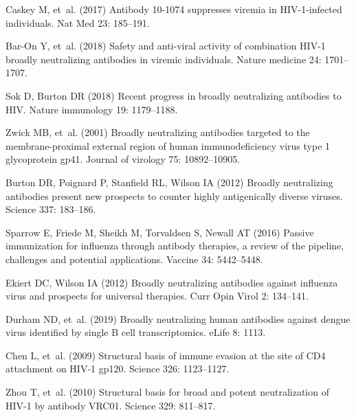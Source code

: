\documentclass[aps,prx,noshowpacs,twocolumn,nofootinbib]{revtex4-2}
\begin{document}
\begin{thebibliography}{10}
Caskey M, et~al. (2017) {Antibody 10-1074 suppresses viremia in HIV-1-infected
  individuals.}
\newblock Nat Med 23: 185--191.

{Bar-On} Y, et~al. (2018) Safety and anti-viral activity of combination
  {{HIV}}-1 broadly neutralizing antibodies in viremic individuals.
\newblock Nature medicine 24: 1701--1707.

Sok D, Burton DR (2018) Recent progress in broadly neutralizing antibodies to
  {{HIV}}.
\newblock Nature immunology 19: 1179--1188.

Zwick MB, et~al. (2001) Broadly neutralizing antibodies targeted to the
  membrane-proximal external region of human immunodeficiency virus type 1
  glycoprotein gp41.
\newblock Journal of virology 75: 10892--10905.

Burton DR, Poignard P, Stanfield RL, Wilson IA (2012) Broadly neutralizing
  antibodies present new prospects to counter highly antigenically diverse
  viruses.
\newblock Science 337: 183--186.

Sparrow E, Friede M, Sheikh M, Torvaldsen S, Newall AT (2016) {Passive
  immunization for influenza through antibody therapies, a review of the
  pipeline, challenges and potential applications.}
\newblock Vaccine 34: 5442--5448.

Ekiert DC, Wilson IA (2012) {Broadly neutralizing antibodies against influenza
  virus and prospects for universal therapies.}
\newblock Curr Opin Virol 2: 134--141.

Durham ND, et~al. (2019) {Broadly neutralizing human antibodies against dengue
  virus identified by single B cell transcriptomics.}
\newblock eLife 8: 1113.

Chen L, et~al. (2009) {Structural basis of immune evasion at the site of CD4
  attachment on HIV-1 gp120.}
\newblock Science 326: 1123--1127.

Zhou T, et~al. (2010) {Structural basis for broad and potent neutralization of
  HIV-1 by antibody VRC01.}
\newblock Science 329: 811--817.


\end{thebibliography}
\end{document}
